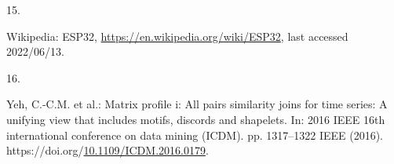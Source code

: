 \documentclass[runningheads]{llncs}
\newlength{\cslhangindent}
\newlength{\csllabelwidth}
\newenvironment{CSLReferences}[2] %
 {%
  \setlength{\parindent}{0pt}
  \ifodd #1 \everypar{\setlength{\hangindent}{\cslhangindent}}\ignorespaces\fi
  \ifnum #2 > 0
  \setlength{\parskip}{#2\baselineskip}
  \fi
 }%
 {}
\newcommand{\CSLLeftMargin}[1]{\parbox[t]{\csllabelwidth}{#1}}
\newcommand{\CSLRightInline}[1]{\parbox[t]{\linewidth - \csllabelwidth}{#1}\break}
\begin{document}
\begin{CSLReferences}{0}{0}
\leavevmode{}%
\CSLLeftMargin{15. }
\CSLRightInline{Wikipedia: ESP32, \url{https://en.wikipedia.org/wiki/ESP32}, last accessed 2022/06/13.}

\leavevmode{}%
\CSLLeftMargin{16. }
\CSLRightInline{Yeh, C.-C.M. et al.: Matrix profile i: All pairs similarity joins for time series: A unifying view that includes motifs, discords and shapelets. In: 2016 IEEE 16th international conference on data mining (ICDM). pp. 1317--1322 IEEE (2016). https://doi.org/\href{https://doi.org/10.1109/ICDM.2016.0179}{10.1109/ICDM.2016.0179}.}

\end{CSLReferences}
\end{document}
